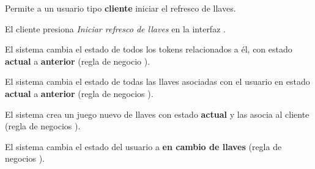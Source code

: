 %
%

{
  Permite a un usuario tipo \textbf{cliente} iniciar el refresco de llaves.

  \begin{trayectoriaPrincipal}

    \item El cliente presiona \textit{Iniciar refresco de llaves} en la interfaz
      .

    \item El sistema cambia el estado de todos los tokens relacionados a él, con
      estado \textbf{actual} a \textbf{anterior} (regla de negocio
      ).

    \item El sistema cambia el estado de todas las llaves asociadas con el
      usuario en estado \textbf{actual} a \textbf{anterior} (regla de negocios
      ).

    \item El sistema crea un juego nuevo de llaves con estado \textbf{actual}
      y las asocia al cliente (regla de negocios
      ).

    \item El sistema cambia el estado del usuario a
      \textbf{en cambio de llaves} (regla de negocios
      ).

  \end{trayectoriaPrincipal}
}
